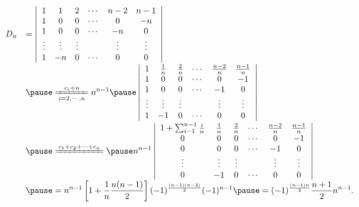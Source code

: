 \begin{frame}
  \begin{footnotesize}
    $$
    \begin{array}{ll}
      D_n & \disp = \left|
      \begin{array}{cccccc}
        1   &  1 &  2 & \cd &  n-2 & n-1\\
        1   &  0 &  0 & \cd &   0  & -n \\
        1   &  0 &  0 & \cd &  -n  & 0\\
        \vd & \vd & \vd&     & \vd  & \vd \\
        1   & -n &  0 & \cd &   0   & 0
      \end{array}
      \right| \\[1.0cm]
      & \pause \disp \xlongequal[i=2,\cd,n]{c_i\div n} n^{n-1} \pause
      \left|
      \begin{array}{cccccc}
        1   &  \frac 1n & \frac 2n & \cd &  \frac{n-2}n & \frac{n-1}n\\
        1   &  0 &  0 & \cd &   0  & -1 \\
        1   &  0 &  0 & \cd &  -1  & 0\\
        \vd & \vd & \vd&     & \vd  & \vd \\
        1   & -1 &  0 & \cd &   0   & 0
      \end{array}
      \right|\\[1.0cm]
      &\pause \disp \xlongequal{c_1+c_2+\cd+c_n} \pause
      n^{n-1} \left|
      \begin{array}{cccccc}
        1+\sum_{i-1}^{n-1}\frac in   &  \frac 1n & \frac 2n & \cd &  \frac{n-2}n & \frac{n-1}n\\
        0   &  0 &  0 & \cd &   0  & -1 \\
        0   &  0 &  0 & \cd &  -1  & 0\\
        \vd & \vd & \vd&     & \vd  & \vd \\
        0   & -1 &  0 & \cd &   0   & 0
      \end{array}       
      \right|\\[0.8cm]
      & \pause \disp= n^{n-1} \left[ 1 + \frac 1n \frac {n(n-1)}2\right] 
      (-1)^{\frac{(n-1)(n-2)}2}(-1)^{n-1} \pause= (-1)^{\frac{(n-1)n}2} \frac{n+1}2 n^{n-1}.
    \end{array}
    $$

  \end{footnotesize}
\end{frame}


